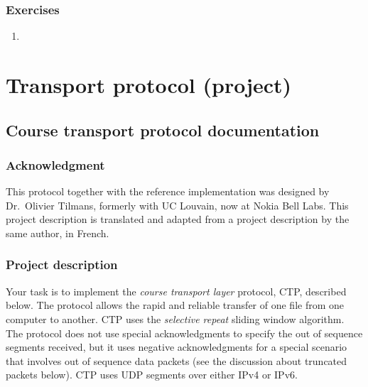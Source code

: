 \documentclass[12pt]{book}
\begin{document}
\begin{enumerate}[label=\arabic*.]
\begin{enumerate}[label=Activity \arabic*)]
\end{enumerate}


\section{Exercises}\label{pl7.ex}

\begin{enumerate}[label=\arabic*.]
\item \label{pl7.unu}
\end{enumerate}


\part{Transport protocol (project)}\label{protocol.part}

\newcommand{\must}{\textbf{MUST}}
\newcommand{\should}{\textbf{SHOULD}}

\newcommand{\pdata}{\texttt{PTYPE\_DATA}}
\newcommand{\pack}{\texttt{PTYPE\_ACK}}
\newcommand{\pnack}{\texttt{PTYPE\_NACK}}

\newcommand{\sender}{\texttt{sender}}
\newcommand{\receiver}{\texttt{receiver}}


\chapter{Course transport protocol documentation}\label{proto-doc.se}

\section{Acknowledgment}

This protocol together with the reference implementation was designed by Dr.~Olivier Tilmans, formerly with UC Louvain, now at Nokia Bell Labs. This project description is translated and adapted from a project description by the same author, in French.

\section{Project description}

Your task is to implement the \emph{course transport layer} protocol, CTP, described below. The protocol allows the rapid and reliable transfer of one file from one computer to another. CTP uses the \emph{selective repeat} sliding window algorithm. The protocol does not use special acknowledgments to specify the out of sequence segments received, but it uses negative acknowledgments for a special scenario that involves out of sequence data packets (see the discussion about truncated packets below). CTP uses UDP segments over either IPv4 or IPv6.


\end{enumerate}
\end{document}
